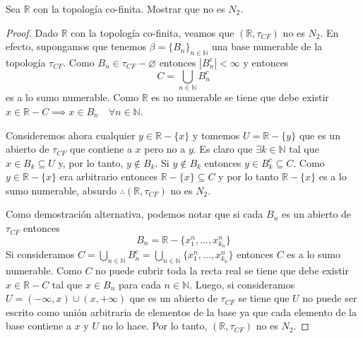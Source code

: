 \documentclass{article}
\theoremstyle{definition}
\newcommand{\R}{\mathbb{R}}
\newcommand{\N}{\mathbb{N}}
\newenvironment{ejercicio}[1]{\begin{trivlist}
\item[\hskip \labelsep {\bfseries Ejercicio}\hskip \labelsep {\bfseries #1.}]}{\end{trivlist}}
\begin{document}
\begin{ejercicio}{7}
    Sea \(\R \) con la topología co-finita. Mostrar que no es \(N_{2}\).
\end{ejercicio}
\begin{proof}
    Dado \( \R \) con la topología co-finita, veamos que \( (\R, \tau_{CF}) \) no es \( N_2 \). En efecto, supongamos que tenemos \( \beta = {\{ B_n \}}_{n \in \N} \) una base numerable de la topología \( \tau_{CF} \).
    Como \( B_n \in \tau_{CF} - \varnothing \) entonces \( |B_n^c| < \infty \) y entonces \[
        C = \bigcup_{n \in \N} B_n^c
    \]
    es a lo sumo numerable. Como \( \R \) es no numerable se tiene que debe existir \( x \in \R - C \implies x \in B_n \quad \forall n \in \N \).

    Consideremos ahora cualquier \( y \in \R - \{ x \} \) y tomemos \( U = \R - \{ y \} \) que es un abierto de \( \tau_{CF} \) que contiene a \( x \) pero no a \( y \). Es claro que \( \exists k \in \N \) tal que
    \( x \in B_k \subseteq U \) y, por lo tanto, \( y \notin B_k \). Si \( y \notin B_k \) entonces \( y \in B_k^c \subseteq C \).
    Como \( y \in \R - \{ x \} \) era arbitrario entonces \( \R - \{ x \} \subseteq C \) y por lo tanto \( \R - \{ x \} \) es a lo sumo numerable, absurdo \( \therefore (\R, \tau_{CF}) \) no es \( N_2 \).


    Como demostración alternativa, podemos notar que si cada \( B_n \) es un abierto de \( \tau_{CF} \) entonces \[
        B_n = \R - \{ x_1^n, \ldots, x_{k_n}^n \}
    \]
    Si consideramos \( C = \bigcup_{n \in \N} B_n^c = \bigcup_{n \in \N} \{ x_1^n, \ldots, x_{k_n}^n \} \) entonces \( C \) es a lo sumo numerable. Como \( C \) no puede cubrir toda la recta real se tiene que debe existir
    \( x \in \R - C \) tal que \( x \in B_n \) para cada \( n \in \N \). Luego, si consideramos \( U = (-\infty, x) \cup (x, +\infty) \) que es un abierto de \( \tau_{CF} \) se tiene que \( U \) no puede ser escrito como
    unión arbitraria de elementos de la base ya que cada elemento de la base contiene a \( x \) y \( U \) no lo hace. Por lo tanto, \( (\R, \tau_{CF}) \) no es \( N_2 \).
\end{proof}
\end{document}
